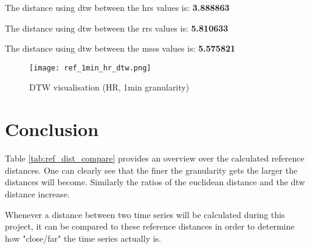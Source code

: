 The distance using \ac{dtw} between the \acp{hr} values is: \textbf{3.888863}


The distance using \ac{dtw} between the \acp{rr} values is: \textbf{5.810633}


The distance using \ac{dtw} between the \acp{mss} values is: \textbf{5.575821}


\begin{figure}[h!]
	\texttt{[image: ref\_1min\_hr\_dtw.png]}
	\caption{DTW visualisation (HR, 1min granularity)}
	\label{fig:ref_dtw_dist_1_min_granularity}
\end{figure}


\clearpage
\section{Conclusion}

Table \ref{tab:ref_dist_compare} provides an overview over the calculated reference distances. One can clearly see that the finer the granularity gets the larger the distances will become. Similarly the ratios of the euclidean distance and the \ac{dtw} distance increase.

\begin{table}[h!]
\centering
{}
\caption{Reference Distances Comperation}
\label{tab:ref_dist_compare}
\end{table}

Whenever a distance between two time series will be calculated during this project, it can be compared to these reference distances in order to determine how "close/far" the time series actually is.





